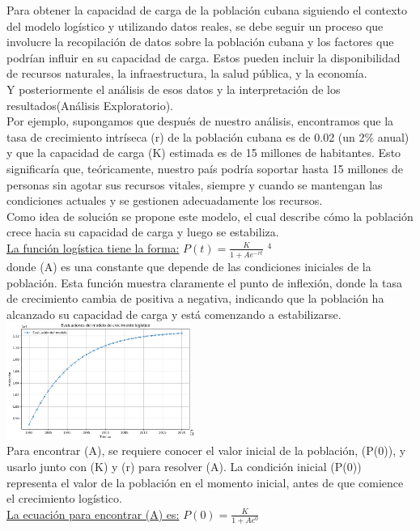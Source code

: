 \documentclass[a4paper,10pt,twocolumn]{article}
\begin{document}
Para obtener la capacidad de carga de la población cubana siguiendo el contexto del modelo logístico y utilizando 
datos reales, se debe seguir un proceso que involucre la recopilación de datos sobre la población cubana y 
los factores que podrían influir en su capacidad de carga. Estos pueden incluir la disponibilidad de recursos 
naturales, la infraestructura, la salud pública, y la economía.\\
Y posteriormente el análisis de esos datos y la interpretación de los resultados(Análisis Exploratorio).\\
Por ejemplo, supongamos que después de nuestro análisis, encontramos que la tasa de crecimiento intríseca (r) de la población 
cubana es de 0.02 (un 2\% anual) y que la capacidad de carga (K) estimada es de 15 millones de habitantes. 
Esto significaría que, teóricamente, nuestro país podría soportar hasta 15 millones de personas sin agotar sus recursos 
vitales, siempre y cuando se mantengan las condiciones actuales y se gestionen adecuadamente los recursos.\\
Como idea de solución se propone este modelo, el cual describe cómo la población crece hacia su capacidad de 
carga y luego se estabiliza.\\ 
\underline{La función logística tiene la forma:} $P(t) = \frac{K}{1 + Ae^{-rt}}$ $^{4}$\\
donde (A) es una constante que depende de las condiciones iniciales de la población. Esta función muestra claramente 
el punto de inflexión, donde la tasa de crecimiento cambia de positiva a negativa, indicando que la población 
ha alcanzado su capacidad de carga y está comenzando a estabilizarse.
\includegraphics[width=0.45\textwidth]{img/model.png}$^{5}$\\
Para encontrar (A), se requiere conocer el valor inicial de la población, (P(0)), y usarlo junto con (K) y (r) 
para resolver (A). La condición inicial (P(0)) representa el valor de la población en el momento inicial, antes de 
que comience el crecimiento logístico.\\
\underline{La ecuación para encontrar (A) es:} $P(0) = \frac{K}{1 + Ae^{0}}$\\
\end{document}
